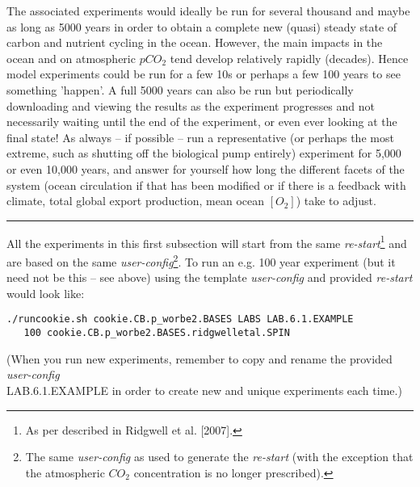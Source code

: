 \newpage
%
The associated experiments would ideally be run for several thousand and maybe as long as 5000 years in order to obtain a complete new (quasi) steady state of carbon and nutrient cycling in the ocean. However, the main impacts in the ocean and on atmospheric \(pCO_{2}\) tend develop relatively rapidly (decades). Hence model experiments could be run for a few 10s or perhaps a few 100 years to see something 'happen'.  A full 5000 years can also be run but periodically downloading and viewing the results as the experiment progresses and not necessarily waiting until the end of the experiment, or even ever looking at the final state! As always -- if possible -- run a representative (or perhaps the most extreme, such as shutting off the biological pump entirely) experiment for 5,000 or even 10,000 years, and answer for yourself how long the different facets of the system (ocean circulation if that has been modified or if there is a feedback with climate, total global export production, mean ocean \([O_{2}]\)) take to adjust.

\vspace{1mm}
\noindent\rule{4cm}{0.5pt}
\vspace{2mm}

\noindent All the experiments in this first subsection will start from the same \textit{re-start}\footnote{As per described in Ridgwell et al. [2007].} and are based on the same \textit{user-config}\footnote{The same \textit{user-config} as used to generate the \textit{re-start} (with the exception that the atmospheric \(CO_{2}\) concentration is no longer prescribed).}. To run an e.g. 100 year experiment (but it need not be this -- see above) using the template \textit{user-config} and provided \textit{re-start} would look like:
\vspace{-1mm}\small\begin{verbatim}
./runcookie.sh cookie.CB.p_worbe2.BASES LABS LAB.6.1.EXAMPLE 
   100 cookie.CB.p_worbe2.BASES.ridgwelletal.SPIN
\end{verbatim}\normalsize\vspace{-1mm}
(When you run new experiments, remember to copy and rename the provided \textit{user-config} \\\textsf{\footnotesize LAB.6.1.EXAMPLE} in order to create new and unique experiments each time.)

